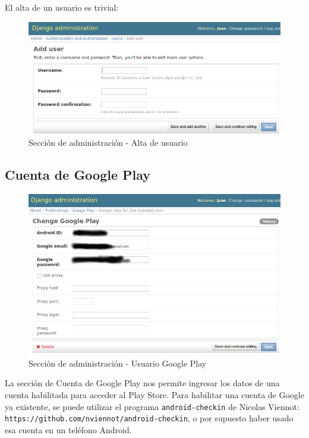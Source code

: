 \documentclass[11pt]{article}
\begin{document}
El alta de un usuario es trivial:
\begin{figure}[H]
\begin{center}
\includegraphics[width=\textwidth]{graphics/marvin4.png}
\caption{Sección de administración - Alta de usuario} \label{altaus}
\end{center}
\end{figure}
\subsection{Cuenta de Google Play}
\begin{figure}[H]
\begin{center}
\includegraphics[width=\textwidth]{graphics/marvin3.png}
\caption{Sección de administración - Usuario Google Play} \label{googleplay_acct}
\end{center}
\end{figure}
La sección de Cuenta de Google Play nos permite ingresar los datos de una cuenta habilitada para acceder al Play Store. Para habilitar una cuenta de Google ya existente, se puede utilizar el programa \texttt{android-checkin} de Nicolas Viennot:
\texttt{https://github.com/nviennot/android-checkin}, o por supuesto haber usado esa cuenta en un teléfono Android.
\end{document}
